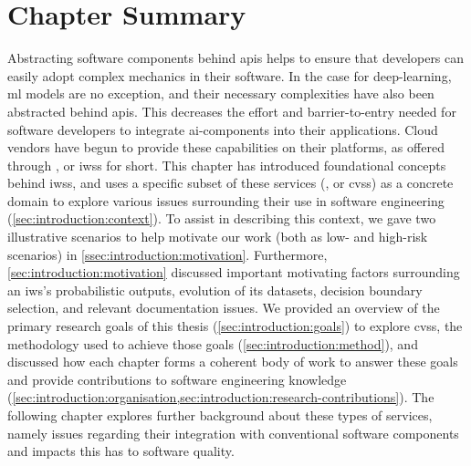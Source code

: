 



\section{Chapter Summary}

Abstracting software components behind \glspl{api} helps to ensure that developers can easily adopt complex mechanics in their software. In the case for deep-learning, \gls{ml} models are no exception, and their necessary complexities have also been abstracted behind \glspl{api}. This decreases the effort and barrier-to-entry needed for software developers to integrate \gls{ai}-components into their applications. Cloud vendors have begun to provide these capabilities on their platforms, as  offered through , or \glspl{iws} for short. This chapter has introduced foundational concepts behind \glspl{iws}, and uses a specific subset of these services (, or \glspl{cvs}) as a concrete domain to explore various issues surrounding their use in software engineering (\cref{sec:introduction:context}). To assist in describing this context, we gave two illustrative scenarios to help motivate our work (both as low- and high-risk scenarios) in \cref{ssec:introduction:motivation}. Furthermore, \cref{sec:introduction:motivation} discussed important motivating factors surrounding an \gls{iws}'s probabilistic outputs, evolution of its datasets, decision boundary selection, and relevant documentation issues.  We provided an overview of the primary research goals of this thesis (\cref{sec:introduction:goals}) to explore \glspl{cvs}, the methodology used to achieve those goals (\cref{sec:introduction:method}), and  discussed how each chapter forms a coherent body of work to answer these goals and provide contributions to software engineering knowledge (\cref{sec:introduction:organisation,sec:introduction:research-contributions}). The following chapter explores further background about these types of services, namely issues regarding their integration with conventional software components and impacts this has to software quality.

